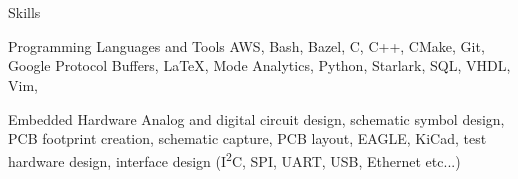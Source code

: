 \section{\faToolbox}{Skills}

 \resumeEntryStart
 \resumeEntryS
	{Programming Languages and Tools}
	{
    AWS,
    Bash,
    Bazel,
    C,
    C++,
    CMake,
    Git,
    Google Protocol Buffers,
    \LaTeX,
    Mode Analytics,
    Python,
    Starlark,
    SQL,
    VHDL,
    Vim,
	}

  \resumeEntryS
	{Embedded Hardware}
	{
     Analog and digital circuit design, schematic symbol design, PCB footprint
     creation, schematic capture, PCB layout, EAGLE, KiCad, test hardware
     design, interface design (I\textsuperscript{2}C, SPI, UART, USB, Ethernet
     etc...)
	}

  \vspace{5pt}
 \resumeEntryEnd
